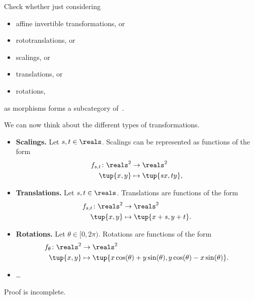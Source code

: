 \begin{exercise}
	\label{ex:draw}
	Check whether just considering
	\begin{itemize}
		\item affine invertible transformations, or
		\item rototranslations, or
		\item scalings, or
		\item translations, or
		\item rotations,
	\end{itemize}
	as morphisms forms a subcategory of~\Draw.
\end{exercise}
\begin{solution}
	We can now think about the different types of transformations.
	\begin{itemize}
		\item \textbf{Scalings.}
		      Let $s,t\in \reals$.
		      Scalings can be represented as functions of the form
		      \begin{equation*}
			      \begin{aligned}
				      f_{s,t}\colon \reals^2 & \to \reals^2           \\
				      \tup{x,y}              & \mapsto \tup{s x,t y},
			      \end{aligned}
		      \end{equation*}
		\item \textbf{Translations.
		      }
		      Let $s,t\in \reals$.
		      Translations are functions of the form
		      \begin{equation*}
			      \begin{aligned}
				      f_{s,t}\colon \reals^2 & \to \reals^2           \\
				      \tup{x,y}              & \mapsto \tup{x+s,y+t}.
			      \end{aligned}
		      \end{equation*}
		\item \textbf{Rotations.}
		      Let $\theta \in [0,2\pi)$.
		      Rotations are functions of the form
		      \begin{equation*}
			      \begin{aligned}
				      f_{\theta}\colon \reals^2 & \to \reals^2                                                            \\
				      \tup{x,y}                 & \mapsto \tup{x\cos(\theta)+y\sin(\theta), y\cos(\theta)-x\sin(\theta)}.
			      \end{aligned}
		      \end{equation*}
		\item \dots

	\end{itemize}

	\begin{publictodo}
		Proof is incomplete.
	\end{publictodo}
\end{solution}

